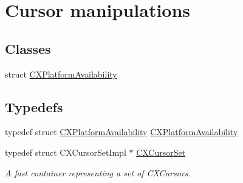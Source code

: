 \hypertarget{group__CINDEX__CURSOR__MANIP}{}\section{Cursor manipulations}
\label{group__CINDEX__CURSOR__MANIP}
\subsection*{Classes}
\begin{DoxyCompactItemize}
\item 
struct \mbox{\hyperlink{structCXPlatformAvailability}{C\+X\+Platform\+Availability}}
\end{DoxyCompactItemize}
\subsection*{Typedefs}
\begin{DoxyCompactItemize}
\item 
typedef struct \mbox{\hyperlink{structCXPlatformAvailability}{C\+X\+Platform\+Availability}} \mbox{\hyperlink{group__CINDEX__CURSOR__MANIP_ga0b3c1f89b3a9bf57c567884e7ebe41c4}{C\+X\+Platform\+Availability}}
\item 
\mbox{\label{group__CINDEX__CURSOR__MANIP_gacca741976831fc313f80970cbf88307d}} 
typedef struct C\+X\+Cursor\+Set\+Impl $\ast$ \mbox{\hyperlink{group__CINDEX__CURSOR__MANIP_gacca741976831fc313f80970cbf88307d}{C\+X\+Cursor\+Set}}
\begin{DoxyCompactList}\small\item\em A fast container representing a set of C\+X\+Cursors. \end{DoxyCompactList}\end{DoxyCompactItemize}
